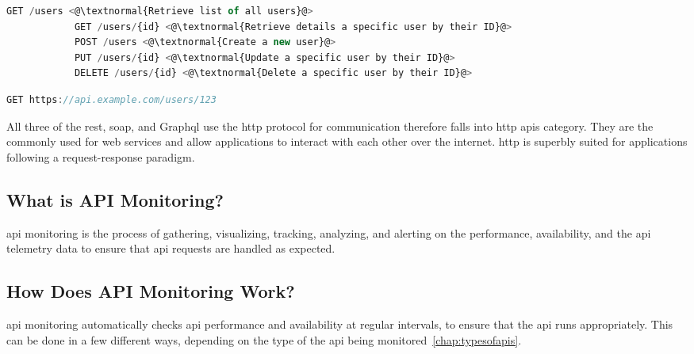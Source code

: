\begin{lstlisting}[language=JavaScript, caption=Different HTTP methods in REST]
            GET /users <@\textnormal{Retrieve list of all users}@>
            GET /users/{id} <@\textnormal{Retrieve details a specific user by their ID}@>
            POST /users <@\textnormal{Create a new user}@>
            PUT /users/{id} <@\textnormal{Update a specific user by their ID}@>
            DELETE /users/{id} <@\textnormal{Delete a specific user by their ID}@>
\end{lstlisting}
\begin{lstlisting}[language=JavaScript, caption=REST's Example Request]
            GET https://api.example.com/users/123
\end{lstlisting}
\begin{multicols}{2}
      All three of the \acrshort{rest}, \acrshort{soap}, and Graph\acrshort{ql} use the \acrshort{http} protocol for
      communication therefore falls into \acrshort{http} \acrshort{api}s category. They are the commonly used for web
      services  and allow applications to interact with each other over the internet. \acrshort{http} is superbly
      suited for applications following a request-response paradigm.



      \subsection{What is API Monitoring?}
      \acrshort{api} monitoring is the process of gathering, visualizing, tracking, analyzing, and alerting on the
      performance, availability, and the \acrshort{api} telemetry data to ensure that \acrshort{api} requests are
      handled as expected.
      \subsection{How Does API Monitoring Work?}
      \acrshort{api} monitoring automatically checks \acrshort{api} performance and availability at regular intervals,
      to ensure that the \acrshort{api} runs appropriately. This can be done in a few different ways, depending on the
      type of the \acrshort{api} being monitored~\ref{chap:typesofapis}.


\end{multicols}
